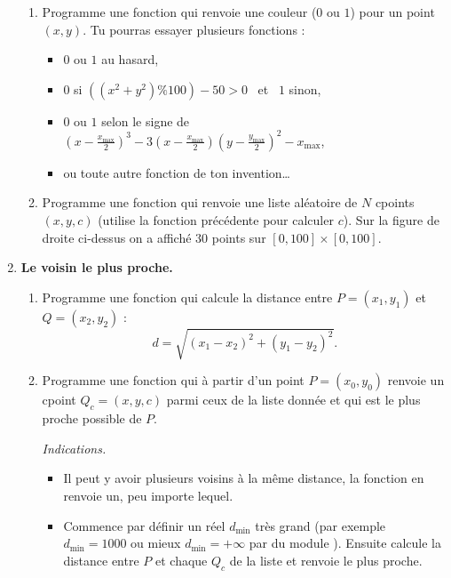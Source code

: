 \documentclass[11pt,class=report,crop=false]{standalone}
\begin{document}
\begin{activite}
\begin{enumerate}
\begin{enumerate}
		\item Programme une fonction  qui renvoie une couleur ($0$ ou $1$) pour un point $(x,y)$.
		Tu pourras essayer plusieurs fonctions :
		\begin{itemize}
			\item $0$ ou $1$ au hasard,
			\item $0$ si $((x^2+y^2)\% 100)  - 50>0$ \  et \  $1$ sinon,
			\item $0$ ou $1$ selon le signe de $\left(x-\frac{x_{\max}}{2}\right)^3 - 3 \left(x-\frac{x_{\max}}{2}\right)\left(y-\frac{y_{\max}}{2}\right)^2 - x_{\max}$,
			\item ou toute autre fonction de ton invention\ldots
		\end{itemize} 
		
		\item Programme une fonction  qui renvoie une liste aléatoire de $N$ cpoints $(x,y,c)$ (utilise la fonction précédente pour calculer $c$).
		Sur la figure de droite ci-dessus on a affiché $30$ points sur $[0,100]\times [0,100]$.
		
	\end{enumerate}
	
	\item \textbf{Le voisin le plus proche.}
	\begin{enumerate}
		\item Programme une fonction  qui calcule la distance entre $P = (x_1,y_1)$ et $Q=(x_2,y_2)$ :
		$$d = \sqrt{(x_1-x_2)^2 + (y_1-y_2)^2}.$$
		
		\item Programme une fonction 
		qui à partir d'un point $P=(x_0,y_0)$ renvoie un cpoint $Q_c = (x,y,c)$ parmi ceux de la liste donnée  et qui est le plus proche possible de $P$.
		
		\emph{Indications.}
		\begin{itemize}
			\item Il peut y avoir plusieurs voisins à la même distance, la fonction en renvoie un, peu importe lequel.
			
			\item Commence par définir un réel $d_{\min}$ très grand (par exemple $d_{\min} = 1000$ ou mieux $d_{\min} = + \infty$ par  du module ). Ensuite calcule la distance entre $P$ et chaque $Q_c$ de la liste et renvoie le plus proche.

		\end{itemize}
	

\end{enumerate}
\end{enumerate}
\end{activite}
\end{document}
